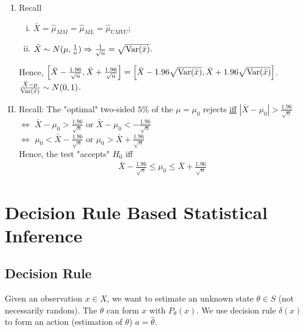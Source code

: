 \documentclass[11pt]{elegantbook}
\begin{document}
\begin{enumerate}[(I).]
    \item Recall
    \begin{enumerate}[(i).]
        \item $\bar{X}=\hat{\mu}_{MM}=\hat{\mu}_{ML}=\hat{\mu}_{UMVU}$;
        \item $\bar{X}\sim N(\mu,\frac{1}{n}) \Rightarrow \frac{1}{\sqrt{n}}=\sqrt{\textnormal{Var}(\bar{x})}$.
    \end{enumerate}
    Hence, $\left[\bar{X}-\frac{1.96}{\sqrt{n}},\bar{X}+\frac{1.96}{\sqrt{n}}\right]=\left[\bar{X}-1.96\sqrt{\textnormal{Var}(\bar{x})},\bar{X}+1.96\sqrt{\textnormal{Var}(\bar{x})}\right]$. $\frac{\bar{X}-\mu}{\textnormal{Var}(\bar{x})}\sim N(0,1)$.
    \item Recall: The "optimal" two-sided $5\%$ of the $\mu=\mu_0$ rejects \underline{iff} $|\bar{X}-\mu_0|>\frac{1.96}{\sqrt{n}}$\\
    $\Leftrightarrow$ $\bar{X}-\mu_0>\frac{1.96}{\sqrt{n}}$ or $\bar{X}-\mu_0<-\frac{1.96}{\sqrt{n}}$\\
    $\Leftrightarrow$ $\mu_0<\bar{X}-\frac{1.96}{\sqrt{n}}$ or $\mu_0>\bar{X}+\frac{1.96}{\sqrt{n}}$\\
    Hence, the test "accepts" $H_0$ iff
    \begin{equation}
        \begin{aligned}
            \bar{X}-\frac{1.96}{\sqrt{n}}\leq \mu_0\leq \bar{X}+\frac{1.96}{\sqrt{n}}
        \end{aligned}
        \nonumber
    \end{equation}
\end{enumerate}


\chapter{Decision Rule Based Statistical Inference}
\section{Decision Rule}
Given an observation $x\in X$, we want to estimate an unknown state $\theta \in S$ (not necessarily random). The $\theta$ can form $x$ with $P_\theta(x)$. We use decision rule $\delta (x)$ to form an action (estimation of $\theta$) $a=\hat{\theta}$.
\end{document}
